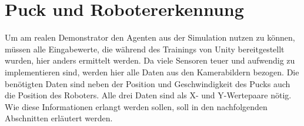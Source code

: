 \clearpage
\section{Puck und Robotererkennung}
\label{sect:puck_robo_erk}
Um am realen Demonstrator den Agenten aus der Simulation nutzen zu können, müssen alle Eingabewerte, die während des Trainings von Unity bereitgestellt wurden, hier anders ermittelt werden. Da viele Sensoren teuer und aufwendig zu implementieren sind, werden hier alle Daten aus den Kamerabildern bezogen. Die benötigten Daten sind neben der Position und Geschwindigkeit des Pucks auch die Position des Roboters. Alle drei Daten sind als X- und Y-Wertepaare nötig. Wie diese Informationen erlangt werden sollen, soll in den nachfolgenden Abschnitten erläutert werden.\\


